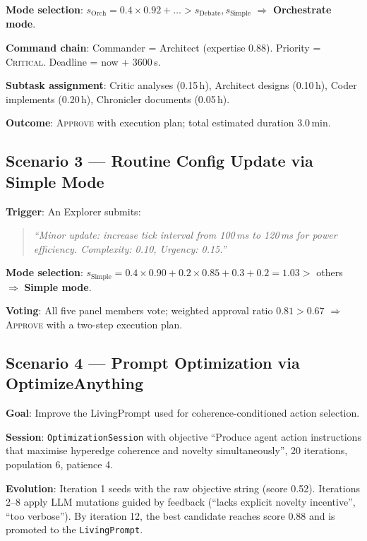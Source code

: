 \documentclass[11pt]{article}
\begin{document}
\noindent\textbf{Mode selection}: $s_{\text{Orch}} = 0.4 \times 0.92 + \ldots >
s_{\text{Debate}}, s_{\text{Simple}}$ $\Rightarrow$ \textbf{Orchestrate mode}.

\noindent\textbf{Command chain}: Commander = Architect (expertise 0.88). Priority
= \textsc{Critical}. Deadline = now + 3600\,s.

\noindent\textbf{Subtask assignment}: Critic analyses (0.15\,h), Architect
designs (0.10\,h), Coder implements (0.20\,h), Chronicler documents (0.05\,h).

\noindent\textbf{Outcome}: \textsc{Approve} with execution plan; total estimated
duration 3.0\,min.

\subsection{Scenario 3 — Routine Config Update via Simple Mode}

\noindent\textbf{Trigger}: An Explorer submits:
\begin{quote}
\small\itshape
``Minor update: increase tick interval from 100\,ms to 120\,ms for power
efficiency. Complexity: 0.10, Urgency: 0.15.''
\end{quote}

\noindent\textbf{Mode selection}: $s_{\text{Simple}} = 0.4 \times 0.90 + 0.2
\times 0.85 + 0.3 + 0.2 = 1.03 >$ others $\Rightarrow$ \textbf{Simple mode}.

\noindent\textbf{Voting}: All five panel members vote; weighted approval ratio
$0.81 > 0.67$ $\Rightarrow$ \textsc{Approve} with a two-step execution plan.

\subsection{Scenario 4 — Prompt Optimization via OptimizeAnything}

\noindent\textbf{Goal}: Improve the LivingPrompt used for coherence-conditioned
action selection.

\noindent\textbf{Session}: \texttt{OptimizationSession} with objective
``Produce agent action instructions that maximise hyperedge coherence and novelty
simultaneously'', 20 iterations, population 6, patience 4.

\noindent\textbf{Evolution}: Iteration 1 seeds with the raw objective string
(score 0.52). Iterations 2--8 apply LLM mutations guided by feedback
(``lacks explicit novelty incentive'', ``too verbose''). By iteration 12, the
best candidate reaches score 0.88 and is promoted to the \texttt{LivingPrompt}.
\end{document}
